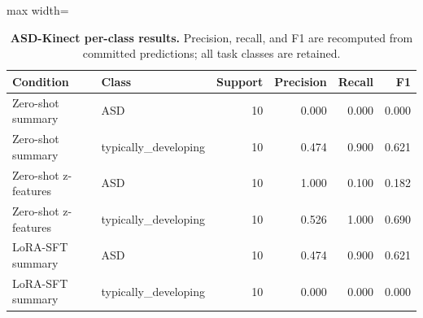 \begin{table}[H]
\centering
\caption{\textbf{ASD-Kinect per-class results.} Precision, recall, and F1 are recomputed from committed predictions; all task classes are retained.}
\label{tab:per_class_asd_kinect}
\small
\begin{adjustbox}{max width=\textwidth}
\begin{tabular}{llrrrr}
\toprule
Condition & Class & Support & Precision & Recall & F1 \\
\midrule
Zero-shot summary & ASD & 10 & 0.000 & 0.000 & 0.000 \\
Zero-shot summary & typically\_developing & 10 & 0.474 & 0.900 & 0.621 \\
Zero-shot z-features & ASD & 10 & 1.000 & 0.100 & 0.182 \\
Zero-shot z-features & typically\_developing & 10 & 0.526 & 1.000 & 0.690 \\
LoRA-SFT summary & ASD & 10 & 0.474 & 0.900 & 0.621 \\
LoRA-SFT summary & typically\_developing & 10 & 0.000 & 0.000 & 0.000 \\
\bottomrule
\end{tabular}
\end{adjustbox}
\end{table}
